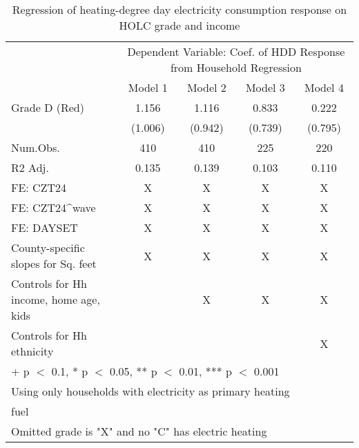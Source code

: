 \documentclass[border=1mm, preview]{standalone}
\begin{document}
\begin{table}

\caption{Regression of heating-degree day electricity consumption response on HOLC grade and income\label{tab:responseelectric1}}
\centering
\begin{tabular}[t]{lcccc}
\toprule
\multicolumn{1}{c}{ } & \multicolumn{4}{c}{Dependent Variable: Coef. of HDD Response from Household Regression} \\
\cmidrule(l{3pt}r{3pt}){2-5}
  & Model 1 & Model 2 & Model 3 & Model 4\\
\midrule
Grade D (Red) & 1.156 & 1.116 & 0.833 & 0.222\\
 & (1.006) & (0.942) & (0.739) & (0.795)\\
\midrule
Num.Obs. & 410 & 410 & 225 & 220\\
R2 Adj. & 0.135 & 0.139 & 0.103 & 0.110\\
FE: CZT24 & X & X & X & X\\
FE: CZT24\textasciicircum{}wave & X & X & X & X\\
FE: DAYSET & X & X & X & X\\
County-specific slopes for Sq. feet & X & X & X & X\\
Controls for Hh income, home age, kids &  & X & X & X\\
Controls for Hh ethnicity &  &  &  & X\\
\bottomrule
\multicolumn{5}{l}{\textsuperscript{} + p $<$ 0.1, * p $<$ 0.05, ** p $<$ 0.01, *** p $<$ 0.001}\\
\multicolumn{5}{l}{\textsuperscript{} Using only households with electricity as primary heating}\\
\multicolumn{5}{l}{fuel}\\
\multicolumn{5}{l}{\textsuperscript{} Omitted grade is "X" and no "C" has electric heating}\\
\end{tabular}
\end{table}
\end{document}
